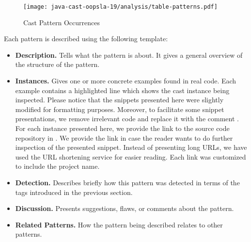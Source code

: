 



\begin{figure}[ht!]
\centering
\texttt{[image: java-cast-oopsla-19/analysis/table-patterns.pdf]}
\caption{Cast Pattern Occurrences} \label{fig:patterns}
\end{figure}

Each pattern is described using the following template:

\begin{itemize}
\item \textbf{Description.}
Tells what the pattern is about.
It gives a general overview of the structure of the pattern.
\item \textbf{Instances.}
Gives one or more concrete examples found in real code.
%
%
Each example contains a highlighted line which shows the cast instance being inspected.
Please notice that the snippets presented here were slightly
modified for formatting purposes.
Moreover, to facilitate some snippet presentations,
we remove irrelevant code and replace it with the
comment \code{// [...]}.
For each instance presented here, we provide the link to the source code repository in \lgtm{}.
We provide the link in case the reader wants to do further inspection
of the presented snippet.
%
%
Instead of presenting \lgtm{} long URLs,
we have used the URL shortening service
\href{https://bitly.com/}{\bitly} for easier reading.
%
%
Each \bitly{} link was customized to include the project name.
\item \textbf{Detection.}
Describes briefly how this pattern was detected in terms of the tags introduced in the previous section.
\item \textbf{Discussion.}
Presents suggestions, flaws, or comments about the pattern.
\item \textbf{Related Patterns.}
%
%
How the pattern being described relates to other patterns.
\end{itemize}

